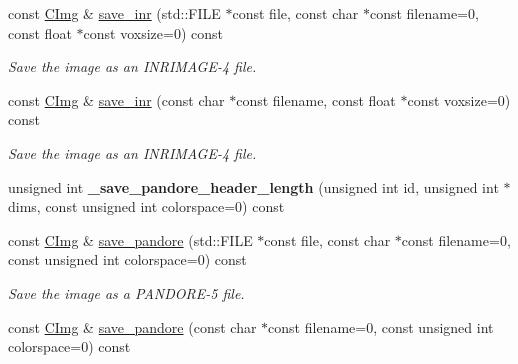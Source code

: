 \begin{DoxyCompactItemize}
\item 
\hypertarget{structcimg__library_1_1_c_img_a1ca63e722e7ad2993bd04c24f29ad9e4}{
const \hyperlink{structcimg__library_1_1_c_img}{CImg} \& \hyperlink{structcimg__library_1_1_c_img_a1ca63e722e7ad2993bd04c24f29ad9e4}{save\_\-inr} (std::FILE $\ast$const file, const char $\ast$const filename=0, const float $\ast$const voxsize=0) const }
\label{structcimg__library_1_1_c_img_a1ca63e722e7ad2993bd04c24f29ad9e4}

\begin{DoxyCompactList}\small\item\em Save the image as an INRIMAGE-\/4 file. \item\end{DoxyCompactList}\item 
\hypertarget{structcimg__library_1_1_c_img_ab60873719770da4eb9724711d997d5b3}{
const \hyperlink{structcimg__library_1_1_c_img}{CImg} \& \hyperlink{structcimg__library_1_1_c_img_ab60873719770da4eb9724711d997d5b3}{save\_\-inr} (const char $\ast$const filename, const float $\ast$const voxsize=0) const }
\label{structcimg__library_1_1_c_img_ab60873719770da4eb9724711d997d5b3}

\begin{DoxyCompactList}\small\item\em Save the image as an INRIMAGE-\/4 file. \item\end{DoxyCompactList}\item 
\hypertarget{structcimg__library_1_1_c_img_ada5e3c699b9b9fe4907c42ab6a4e2c85}{
unsigned int {\bfseries \_\-save\_\-pandore\_\-header\_\-length} (unsigned int id, unsigned int $\ast$dims, const unsigned int colorspace=0) const }
\label{structcimg__library_1_1_c_img_ada5e3c699b9b9fe4907c42ab6a4e2c85}

\item 
\hypertarget{structcimg__library_1_1_c_img_a7930700a82a0939576a91e6c4cf6c248}{
const \hyperlink{structcimg__library_1_1_c_img}{CImg} \& \hyperlink{structcimg__library_1_1_c_img_a7930700a82a0939576a91e6c4cf6c248}{save\_\-pandore} (std::FILE $\ast$const file, const char $\ast$const filename=0, const unsigned int colorspace=0) const }
\label{structcimg__library_1_1_c_img_a7930700a82a0939576a91e6c4cf6c248}

\begin{DoxyCompactList}\small\item\em Save the image as a PANDORE-\/5 file. \item\end{DoxyCompactList}\item 
\hypertarget{structcimg__library_1_1_c_img_a8e17508503ac53b2fa7ace2d216bffe5}{
const \hyperlink{structcimg__library_1_1_c_img}{CImg} \& \hyperlink{structcimg__library_1_1_c_img_a8e17508503ac53b2fa7ace2d216bffe5}{save\_\-pandore} (const char $\ast$const filename=0, const unsigned int colorspace=0) const }
\label{structcimg__library_1_1_c_img_a8e17508503ac53b2fa7ace2d216bffe5}


\end{DoxyCompactItemize}
